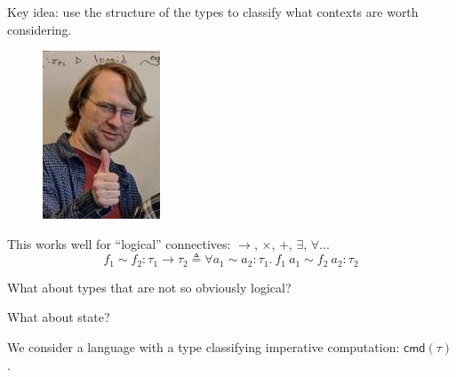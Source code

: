 \documentclass{beamer}
\newcommand{\fn}[2]{\ensuremath{#1 \to #2}}
\newcommand{\cmd}[1]{\ensuremath{\mathsf{cmd}(#1)}}
\newcommand{\ap}[2]{\ensuremath{#1\ #2}}
\begin{document}
\begin{frame}
  \centering
  Key idea: use {\color<2>{PaleGray} the structure of the} types
  { to classify what contexts are worth considering.}
  \pause
  \bigskip

  \begin{figure}
    \includegraphics[height=5cm,keepaspectratio]{happy-karl}
  \end{figure}
\end{frame}

\begin{frame}
  \centering
  This works well for ``logical'' connectives: $\to$, $\times$, $+$,
  $\exists$, $\forall$...
  \[
    f_1 \sim f_2 : \fn{\tau_1}{\tau_2} \triangleq
    \forall a_1 \sim a_2 : \tau_1.\ \ap{f_1}{a_1} \sim \ap{f_2}{a_2} : \tau_2
  \]
  \pause
  \bigskip

  What about types that are not so obviously logical?
\end{frame}

\begin{frame}
  \centering
  What about state?

  \bigskip

  We consider a language with a type classifying imperative
  computation: $\cmd{\tau}$.
\end{frame}

\end{document}
